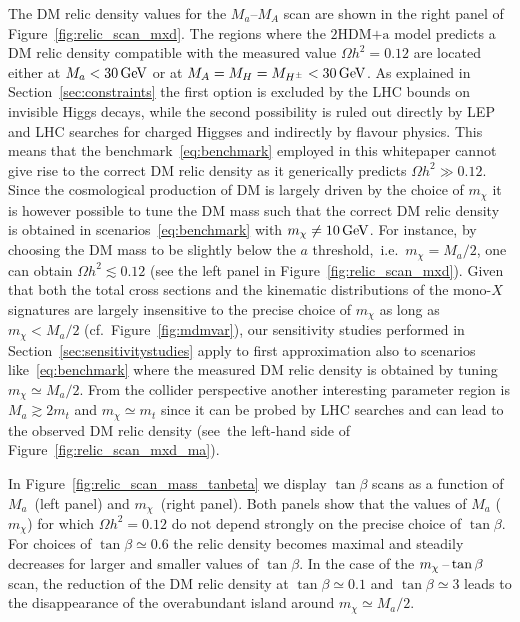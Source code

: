 \documentclass[a4paper, 11pt,notoc]{article}
\newcommand{\mA}{\ensuremath{M_{A}}\xspace}
\newcommand{\ma}{\ensuremath{M_{a}}\xspace}
\newcommand{\mH}{\ensuremath{M_{H}}\xspace}
\newcommand{\mHc}{\ensuremath{M_{H^{\pm}}}\xspace}
\newcommand{\hdma}{\ensuremath{\textrm{2HDM+a}}\xspace}
\begin{document}
 The DM relic density values for the $\ma$--$\mA$ scan  are shown in the right panel of Figure~\ref{fig:relic_scan_mxd}. The regions where the \hdma model predicts a DM relic density compatible with the measured value $\Omega h^{2} = 0.12$ are located either at $\ma < 30 \, {\rm GeV}$ or at $\mA=\mH=\mHc < 30 \, {\rm GeV}$. As explained in Section~\ref{sec:constraints} the first option is excluded by the LHC bounds on invisible Higgs decays, while the second possibility is ruled out directly by LEP and LHC searches for charged Higgses and indirectly by flavour physics. This means that the benchmark~\eqref{eq:benchmark} employed in this whitepaper cannot give rise to the correct DM relic density as it generically predicts $\Omega h^{2} \gg 0.12$.  Since the cosmological production of DM is largely driven by the choice of $m_\chi$ it is however possible to tune the DM mass such that the correct DM relic density is obtained in scenarios~\eqref{eq:benchmark} with $m_\chi \neq 10 \, {\rm GeV}$.  For instance, by choosing the DM mass to be slightly below the $a$ threshold,~i.e.~$m_\chi = \ma/2$, one can obtain $\Omega h^{2} \lesssim 0.12$ (see the left panel in Figure~\ref{fig:relic_scan_mxd}). Given that both the total cross sections and the kinematic distributions of the mono-$X$ signatures are largely insensitive to the precise choice of $m_\chi$ as long as $m_\chi < \ma/2$ (cf.~Figure~\ref{fig:mdmvar}), our sensitivity studies performed in Section~\ref{sec:sensitivitystudies} apply to first approximation also to scenarios like~\eqref{eq:benchmark} where the measured DM relic density is obtained by tuning $ m_\chi \simeq \ma/2$. From the collider perspective another interesting parameter region is $M_a \gtrsim  2 m_t$ and $m_\chi \simeq m_t$ since it can be probed by LHC searches and can lead to the observed DM relic density (see~the left-hand side of Figure~\ref{fig:relic_scan_mxd_ma}).  

 In Figure~\ref{fig:relic_scan_mass_tanbeta} we display $\tan \beta$ scans as a function of $\ma$~(left panel) and $m_\chi$~(right panel). Both panels show that the values of $\ma$ ($m_\chi$) for which $\Omega h^{2} = 0.12$ do not depend strongly on the precise choice of $\tan \beta$. For choices of $\tan \beta \simeq 0.6$ the relic density becomes maximal and steadily decreases for larger and smaller values of $\tan \beta$. In the case of the $m_\chi \hspace{0.5mm}$--$\hspace{0.5mm} \tan \beta$ scan, the reduction of the DM relic density at $\tan \beta \simeq 0.1$ and $\tan \beta \simeq 3$  leads to the disappearance of the overabundant island around $m_\chi\simeq\ma/2$.
 
\end{document}
